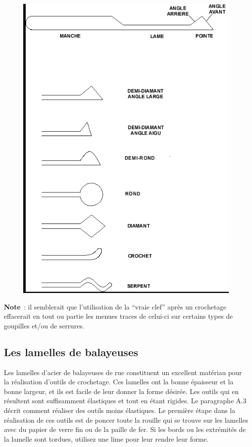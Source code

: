 \documentclass[a4paper,french,11pt,twoside]{report}
\begin{document}
\begin{figure}[h]
  \begin{center}
    \includegraphics[scale=0.6]{images/Image27}
    \caption{}
\end{center}
\end{figure}

\noindent \textbf{Note}~: il semblerait que l'utilisation de la \enquote{vraie clef} après un crochetage effacerait en tout ou partie les menues traces de celui-ci sur certains types de goupilles et/ou de serrures.

\subsection{Les lamelles de balayeuses}

Les lamelles d'acier de balayeuses de rue constituent un excellent matériau pour la réalisation d'outils de crochetage. Ces lamelles ont la bonne épaisseur et la bonne largeur, et ils est facile de leur donner la forme désirée. Les outils qui en résultent sont suffisamment élastiques et tout en étant rigides. Le paragraphe A.3 décrit comment réaliser des outils moins élastiques. Le première étape dans la réalisation de ces outils est de poncer toute la rouille qui se trouve sur les lamelles avec du papier de verre fin ou de la paille de fer. Si les bords ou les extrémités de la lamelle sont tordues, utilisez une lime pour leur rendre leur forme.
\end{document}

